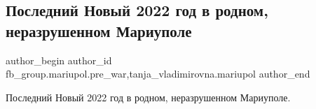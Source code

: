  
 
 
 
 

\subsection{Последний Новый 2022 год в родном, неразрушенном Мариуполе}
\label{sec:15_01_2023.fb.fb_group.mariupol.pre_war.1.poslednii_novii_2022}
 
\ifcmt
 author_begin
   author_id fb_group.mariupol.pre_war,tanja_vladimirovna.mariupol
 author_end
\fi

Последний Новый 2022 год в родном, неразрушенном Мариуполе.

